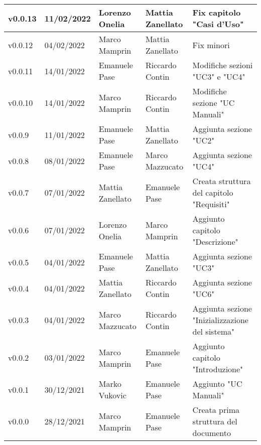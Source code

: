 {\begin{longtable}{|C{1.8cm}|C{2.1cm}|C{2cm}|C{2.4cm}|L{4.4cm}|}
  v0.0.13           & 11/02/2022    & Lorenzo Onelia    & Mattia Zanellato    & Fix capitolo "Casi d'Uso"                       \\ \hline
  v0.0.12           & 04/02/2022    & Marco Mamprin     & Mattia Zanellato    & Fix minori                                      \\ \hline
  v0.0.11           & 14/01/2022    & Emanuele Pase     & Riccardo Contin     & Modifiche sezioni "UC3" e "UC4"                 \\ \hline
  v0.0.10           & 14/01/2022    & Marco Mamprin     & Riccardo Contin     & Modifiche sezione "UC Manuali"                  \\ \hline
  v0.0.9            & 11/01/2022    & Emanuele Pase     & Mattia Zanellato    & Aggiunta sezione "UC2"                          \\ \hline
  v0.0.8            & 08/01/2022    & Emanuele Pase     & Marco Mazzucato     & Aggiunta sezione "UC4"                          \\ \hline
  v0.0.7            & 07/01/2022    & Mattia Zanellato  & Emanuele Pase       & Creata struttura del capitolo "Requisiti"       \\ \hline
  v0.0.6            & 07/01/2022    & Lorenzo Onelia    & Marco Mamprin       & Aggiunto capitolo "Descrizione"                 \\ \hline
  v0.0.5            & 04/01/2022    & Emanuele Pase     & Mattia Zanellato    & Aggiunta sezione "UC3"                          \\ \hline
  v0.0.4            & 04/01/2022    & Mattia Zanellato  & Riccardo Contin     & Aggiunta sezione "UC6"                          \\ \hline
  v0.0.3            & 04/01/2022    & Marco Mazzucato   & Riccardo Contin     & Aggiunta sezione "Inizializzazione del sistema" \\ \hline
  v0.0.2            & 03/01/2022    & Marco Mamprin     & Emanuele Pase       & Aggiunto capitolo "Introduzione"                \\ \hline
  v0.0.1            & 30/12/2021    & Marko Vukovic     & Emanuele Pase       & Aggiunto "UC Manuali"                            \\ \hline
  v0.0.0            & 28/12/2021    & Marco Mamprin     & Emanuele Pase       & Creata prima struttura del documento            \\ \hline
\end{longtable}}

\renewcommand\arraystretch{1}
